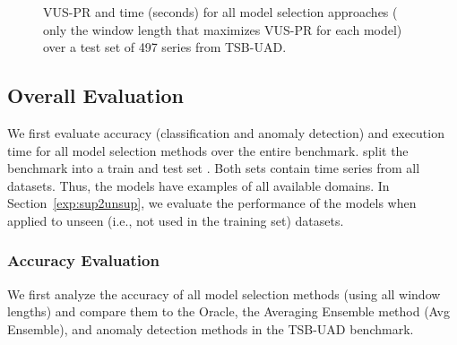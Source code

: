 \begin{figure}
    \vspace{-0.3cm}
    \caption{VUS-PR and  time (seconds) for all model selection approaches ( only the window length that maximizes VUS-PR for each model) over a test set of 497 series from TSB-UAD.} %
    \vspace{-0.3cm}
    \label{fig:overall_res}
\end{figure}


\subsection{Overall Evaluation}
\label{exp:overalleval}

We first evaluate accuracy (classification and anomaly detection) and execution time for all model selection methods over the entire benchmark.  split the benchmark into a train and test set . %
Both sets contain time series from all datasets. Thus, the models have examples of all available domains. In Section~\ref{exp:sup2unsup}, we evaluate the performance of the models when applied to unseen (i.e., not used in the training set) datasets.

\subsubsection{\textbf{Accuracy Evaluation}}

We first analyze the accuracy of all model selection methods (using all window lengths) and compare them to the Oracle, %
the Averaging Ensemble method (Avg Ensemble), %
and anomaly detection methods in the TSB-UAD benchmark.

